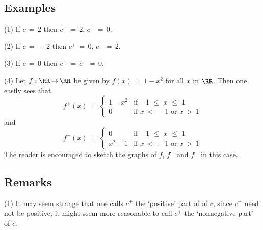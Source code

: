 {\V
\V

            \subsection{\small{\bf Examples}}
            \label{ExampB20.80}


\V

\hspace*{\parindent}(1) If $c \,=\, 2$ then $c^{+} \,=\, 2$, $c^{-} \,=\, 0$.

\V

        (2) If $c \,=\, -2$ then $c^{+} \,=\, 0$, $c^{-} \,=\, 2$.

\V

        (3) If $c \,=\, 0$ then $c^{+} \,=\, c^{-} \,=\, 0$.

\V

        (4) Let $f:{\RR} \,{\rightarrow}\, {\RR}$ be given by $f(x) \,=\, 1-x^{2}$ for all $x$ in ${\RR}$.
    Then one easily sees that
        \begin{displaymath}
        f^{+}(x) \,=\, \left\{
        \begin{array}{cl}
        1-x^{2} & \mbox{if $-1\,\,{\leq}\,\,x\,\,{\leq}\,\,1$} \\
          0     & \mbox{if $x\,<\,-1$ or $x\,>\,1$}
        \end{array}
                                    \right.
        \end{displaymath}
    and
        \begin{displaymath}
        f^{-}(x) \,=\, \left\{
        \begin{array}{cl}
          0      & \mbox{if $-1\,\,{\leq}\,\,x\,\,{\leq}\,\,1$} \\
       x^{2} - 1 & \mbox{if $x\,<\,-1$ or $x\,>\,1$}
        \end{array}
                                    \right.
        \end{displaymath}
    The reader is encouraged to sketch the graphs of $f$, $f^{+}$ and $f^{-}$ in this case.

\V
\V

            \subsection{\small{\bf Remarks}}
            \label{RemrkB20.90}

\V

\hspace*{\parindent}
        (1) It may seem strange that one calls $c^{+}$ the `positive' part of of $c$, since $c^{+}$ need not be positive;
    it might seem more reasonable to call $c^{+}$ the `nonnegative part' of $c$.

}
